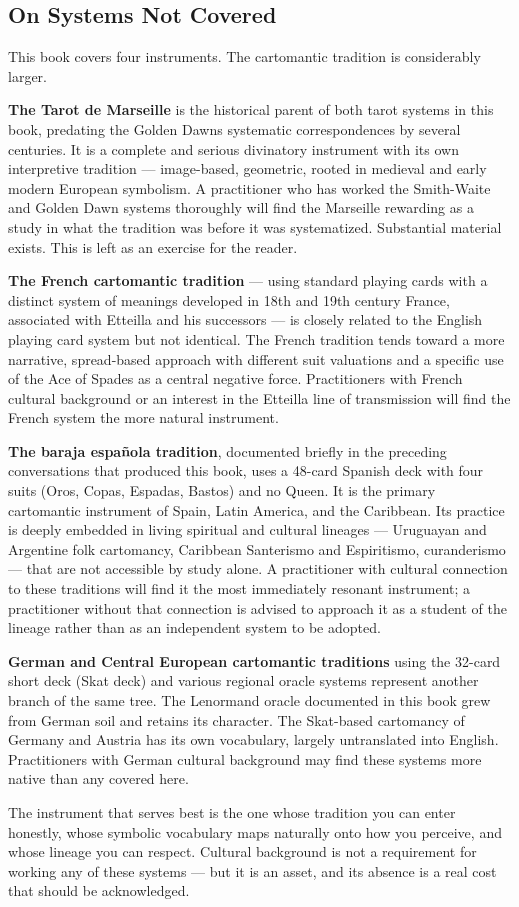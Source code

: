 \subsection{On Systems Not Covered}\label{on-systems-not-covered}

This book covers four instruments. The cartomantic tradition is considerably larger.

\textbf{The Tarot de Marseille} is the historical parent of both tarot systems in this book, predating the Golden Dawn\textquotesingle s systematic correspondences by several centuries. It is a complete and serious divinatory instrument with its own interpretive tradition --- image-based, geometric, rooted in medieval and early modern European symbolism. A practitioner who has worked the Smith-Waite and Golden Dawn systems thoroughly will find the Marseille rewarding as a study in what the tradition was before it was systematized. Substantial material exists. This is left as an exercise for the reader.

\textbf{The French cartomantic tradition} --- using standard playing cards with a distinct system of meanings developed in 18th and 19th century France, associated with Etteilla and his successors --- is closely related to the English playing card system but not identical. The French tradition tends toward a more narrative, spread-based approach with different suit valuations and a specific use of the Ace of Spades as a central negative force. Practitioners with French cultural background or an interest in the Etteilla line of transmission will find the French system the more natural instrument.

\textbf{The baraja española tradition}, documented briefly in the preceding conversations that produced this book, uses a 48-card Spanish deck with four suits (Oros, Copas, Espadas, Bastos) and no Queen. It is the primary cartomantic instrument of Spain, Latin America, and the Caribbean. Its practice is deeply embedded in living spiritual and cultural lineages --- Uruguayan and Argentine folk cartomancy, Caribbean Santerismo and Espiritismo, curanderismo --- that are not accessible by study alone. A practitioner with cultural connection to these traditions will find it the most immediately resonant instrument; a practitioner without that connection is advised to approach it as a student of the lineage rather than as an independent system to be adopted.

\textbf{German and Central European cartomantic traditions} using the 32-card short deck (Skat deck) and various regional oracle systems represent another branch of the same tree. The Lenormand oracle documented in this book grew from German soil and retains its character. The Skat-based cartomancy of Germany and Austria has its own vocabulary, largely untranslated into English. Practitioners with German cultural background may find these systems more native than any covered here.

The instrument that serves best is the one whose tradition you can enter honestly, whose symbolic vocabulary maps naturally onto how you perceive, and whose lineage you can respect. Cultural background is not a requirement for working any of these systems --- but it is an asset, and its absence is a real cost that should be acknowledged.
